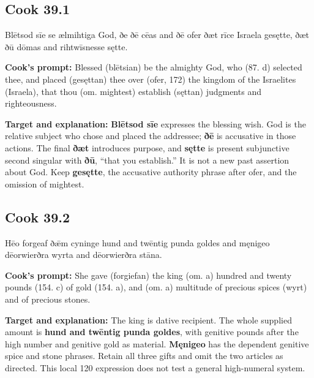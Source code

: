 \par\begin{minipage}{\linewidth}\raggedright
\subsection*{Cook 39.1}

Blētsod sīe se ælmihtiga God, ðe ðē cēas and ðē ofer ðæt rīce Israela gesętte, ðæt ðū dōmas and rihtwīsnesse sętte.

\textbf{Cook's prompt:} Blessed (blētsian) be the almighty God, who (87. d) selected thee, and placed (gesęttan) thee over (ofer, 172) the kingdom of the Israelites (Israela), that thou (om. mightest) establish (sęttan) judgments and righteousness.

\textbf{Target and explanation:} \textbf{Blētsod sīe} expresses the blessing wish. God is the relative subject who chose and placed the addressee; \textbf{ðē} is accusative in those actions. The final \textbf{ðæt} introduces purpose, and \textbf{sętte} is present subjunctive second singular with \textbf{ðū}, “that you establish.” It is not a new past assertion about God. Keep \textbf{gesętte}, the accusative authority phrase after ofer, and the omission of mightest.

\end{minipage}\par\addvspace{4pt}

\par\begin{minipage}{\linewidth}\raggedright
\subsection*{Cook 39.2}

Hēo forgeaf ðǣm cyninge hund and twēntig punda goldes and męnigeo dēorwierðra wyrta and dēorwierðra stāna.

\textbf{Cook's prompt:} She gave (forgiefan) the king (om. a) hundred and twenty pounds (154. c) of gold (154. a), and (om. a) multitude of precious spices (wyrt) and of precious stones.

\textbf{Target and explanation:} The king is dative recipient. The whole supplied amount is \textbf{hund and twēntig punda goldes}, with genitive pounds after the high number and genitive gold as material. \textbf{Męnigeo} has the dependent genitive spice and stone phrases. Retain all three gifts and omit the two articles as directed. This local 120 expression does not test a general high-numeral system.

\end{minipage}\par\addvspace{4pt}

